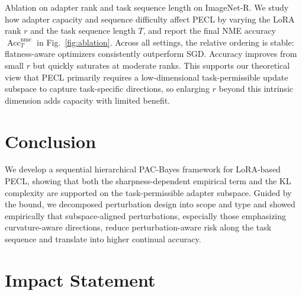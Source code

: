 \documentclass{article}
\theoremstyle{plain}
\theoremstyle{definition}
\theoremstyle{remark}
\begin{document}
\vspace{-4pt}

Ablation on adapter rank and task sequence length on ImageNet-R.
We study how adapter capacity and sequence difficulty affect PECL by varying the LoRA rank $r$ and the task sequence length $T$, and report the final NME accuracy $\operatorname{Acc}_T^{\mathrm{nme}}$ in Fig.~\ref{fig:ablation}.
Across all settings, the relative ordering is stable: flatness-aware optimizers consistently outperform SGD.
Accuracy improves from small $r$ but quickly saturates at moderate ranks. This supports our theoretical view that PECL primarily requires a low-dimensional task-permissible update subspace to capture task-specific directions, so enlarging $r$ beyond this intrinsic dimension adds capacity with limited benefit.




\section{Conclusion}

We develop a sequential hierarchical PAC-Bayes framework for LoRA-based PECL, showing that both the sharpness-dependent empirical term and the KL complexity are supported on the task-permissible adapter subspace. Guided by the bound, we decomposed perturbation design into scope and type and showed empirically that subspace-aligned perturbations, especially those emphasizing curvature-aware directions, reduce perturbation-aware risk along the task sequence and translate into higher continual accuracy.







\section*{Impact Statement}

\end{document}

